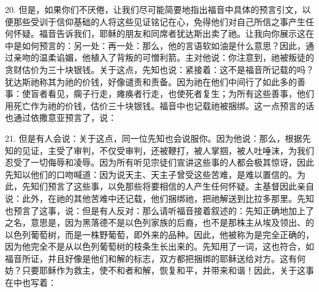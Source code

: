 20. 但是，如果你们不厌倦，让我们尽可能简要地指出福音中具体的预言引文，以便那些受训于信仰基础的人将这些见证铭记在心，免得他们对自己所信之事产生任何怀疑。福音告诉我们，耶稣的朋友和同席者犹达斯出卖了祂。让我向你展示这在中是如何预言的：另一处：再一处：那么，他的言语软如油是什么意思？因此，通过亲吻的温柔谄媚，他植入了背叛的可憎利箭。主对他说：你注意到，祂被叛徒的贪财估价为三十块银钱。关于这点，先知也说：紧接着：这不是福音所记载的吗？犹达斯祂称其为祂的价钱，好像谴责和责备。因为祂在他们中间行了如此多的善事：使盲者看见，瘸子行走，瘫痪者行走，也使死者复生；为所有这些善事，他们用死亡作为祂的价钱，估价三十块银钱。福音中也记载祂被捆绑。这一点预言的话也通过依撒意亚预言了，说：\par

21. 但是有人会说：关于这点，同一位先知也会说服你。因为他说：那么，根据先知的见证，主受了审判，不仅受审判，还被鞭打，被人掌掴，被人吐唾沫，为我们忍受了一切侮辱和凌辱。因为所有听见宗徒们宣讲这些事的人都会极其惊讶，因此先知以他们的口吻喊道：因为说天主、天主子曾受这些苦难，是难以置信的。为此，先知们预言了这些事，以免那些将要相信的人产生任何怀疑。主基督因此亲自说：此外，在祂的其他苦难中还记载，他们捆绑祂，把祂解送到比拉多那里。先知也预言了这事，说：但是有人反对：那么请听福音接着叙述的：先知正确地加上了之名，意思是，因为黑落德不是以色列家族的后裔，也不是那株主从埃及领出、的以色列葡萄树，而是一株野葡萄，即外来的品种。因此，他被称为是完全正确的，因为他完全不是从以色列葡萄树的枝条生长出来的。先知用了一词，这也符合，如福音所证，并且好像是他们和解的标志，双方都把捆绑的耶稣送给对方。这有何妨？只要耶稣作为救主，使不和者和解，恢复和平，并带来和谐！因此，关于这事在中也写着：\par

